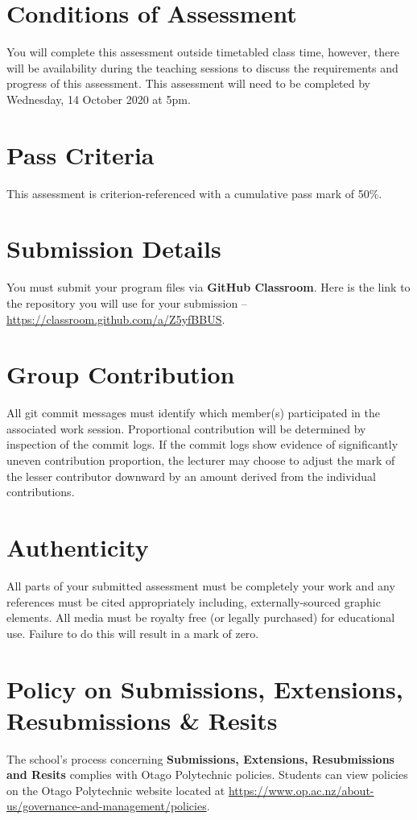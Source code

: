 \documentclass{article}
\begin{document}
\section*{Conditions of Assessment}
You will complete this assessment outside timetabled class time, however, there will be availability during the teaching sessions to discuss the requirements and progress of this assessment. This assessment will need to be completed by Wednesday, 14 October 2020 at 5pm. 

\section*{Pass Criteria}
This assessment is criterion-referenced with a cumulative pass mark of 50\%.

\section*{Submission Details}
You must submit your program files via \textbf{GitHub Classroom}. Here is the link to the repository you will use for your submission – \href{https://classroom.github.com/a/Z5yfBBUS}{https://classroom.github.com/a/Z5yfBBUS}.

\section*{Group Contribution}
All git commit messages must identify which member(s) participated in the associated work session. Proportional contribution will be determined by inspection of the commit logs. If the commit logs show evidence of significantly uneven contribution proportion, the lecturer may choose to adjust the mark of the lesser contributor downward by an amount derived from the individual contributions.

\section*{Authenticity}
All parts of your submitted assessment must be completely your work and any references must be cited appropriately including, externally-sourced graphic elements. All media must be royalty free (or legally purchased) for educational use. Failure to do this will result in a mark of zero.

\section*{Policy on Submissions, Extensions, Resubmissions \& Resits}
The school's process concerning \textbf{Submissions, Extensions, Resubmissions and Resits} complies with Otago Polytechnic policies. Students can view policies on the Otago Polytechnic website located at \href{https://www.op.ac.nz/about-us/governance-and-management/policies}{https://www.op.ac.nz/about-us/governance-and-management/policies}.
\end{document}

